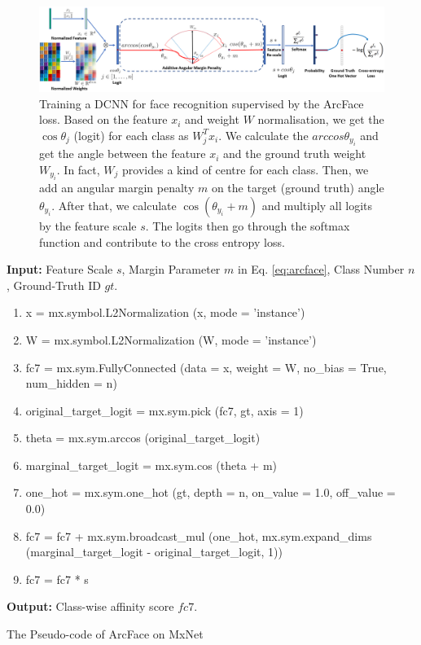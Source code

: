 \documentclass[10pt,twocolumn,letterpaper]{article}
\begin{document}
\begin{figure}[t!]
\centering
\includegraphics[width=0.9\linewidth]{image/arcfaceframework.png}
\vspace{-1mm}
\caption{Training a DCNN for face recognition supervised by the ArcFace loss. Based on the feature $x_i$ and weight $W$ normalisation, we get the $\cos\theta_j$ (logit) for each class as $W^T_j x_i$. We calculate the $arccos\theta_{y_i}$ and get the angle between the feature $x_i$ and the ground truth weight $W_{y_i}$. In fact, $W_j$ provides a kind of centre for each class. Then, we add an angular margin penalty $m$ on the target (ground truth) angle $\theta_{y_i}$. After that, we calculate $\cos(\theta_{y_i}+m)$ and multiply all logits by the feature scale $s$. The logits then go through the softmax function and contribute to the cross entropy loss.}
\vspace{-3mm}
\label{fig:arcfacelossframework}
\end{figure}

\begin{algorithm*}[!htb]
\begin{algorithmic}
\STATE \textbf{Input:} Feature Scale $s$, Margin Parameter $m$ in Eq. \ref{eq:arcface}, Class Number $n$, Ground-Truth ID $gt$.
\vspace{-3mm}
\begin{enumerate} \setlength{\itemsep}{-\itemsep}
\item x = mx.symbol.L2Normalization (x, mode = 'instance')
\item W = mx.symbol.L2Normalization (W, mode = 'instance')
\item fc7 = mx.sym.FullyConnected (data = x, weight = W, no\_bias = True, num\_hidden = n)
\item original\_target\_logit = mx.sym.pick (fc7, gt, axis = 1)
\item theta = mx.sym.arccos (original\_target\_logit)
\item marginal\_target\_logit = mx.sym.cos (theta + m)
\item one\_hot = mx.sym.one\_hot (gt, depth = n, on\_value = 1.0, off\_value = 0.0)
\item fc7 = fc7 + mx.sym.broadcast\_mul (one\_hot, mx.sym.expand\_dims (marginal\_target\_logit - original\_target\_logit, 1))
\item fc7 = fc7 * s
\end{enumerate}
\vspace{-3mm}
\STATE \textbf{Output:} Class-wise affinity score $fc7$.
\end{algorithmic}
\caption{The Pseudo-code of ArcFace on MxNet}
\label{alg}
\end{algorithm*}
\end{document}
